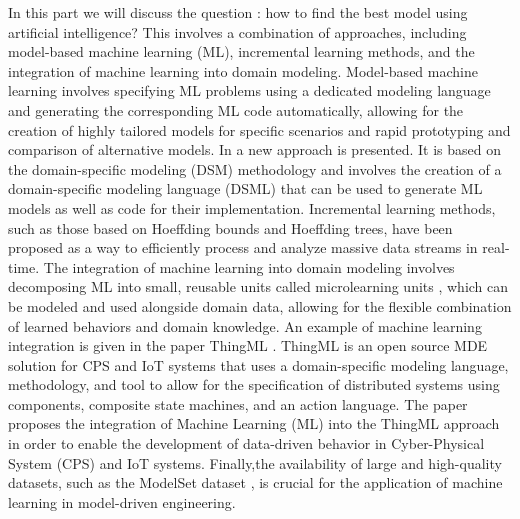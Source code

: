 In this part we will discuss the question : how to find the best model using artificial intelligence? This involves a combination of approaches, including model-based machine learning (ML), incremental learning methods, and the integration of machine learning into domain modeling. 
Model-based machine learning involves specifying ML problems using a dedicated modeling language and generating the corresponding ML code automatically, allowing for the creation of highly tailored models for specific scenarios and rapid prototyping and comparison of alternative models\cite{evolutionMDE}. In \cite{mdApproach} a new approach is presented. It is based on the domain-specific modeling (DSM) methodology and involves the creation of a domain-specific modeling language (DSML) that can be used to generate ML models as well as code for their implementation.
Incremental learning methods, such as those based on Hoeffding bounds and Hoeffding trees, have been proposed as a way to efficiently process and analyze massive data streams in real-time\cite{evolutionMDE}. 
The integration of machine learning into domain modeling involves decomposing ML into small, reusable units called microlearning units \cite{evolutionMDE}, which can be modeled and used alongside domain data, allowing for the flexible combination of learned behaviors and domain knowledge. An example of machine learning integration is given in the paper ThingML \cite{ThingML}.  ThingML is an open source MDE solution for CPS and IoT systems that uses a domain-specific modeling language, methodology, and tool to allow for the specification of distributed systems using components, composite state machines, and an action language. The paper proposes the integration of Machine Learning (ML) into the ThingML approach in order to enable the development of data-driven behavior in Cyber-Physical System (CPS) and IoT systems. Finally,the availability of large and high-quality datasets, such as the ModelSet dataset \cite{modelset}, is crucial for the application of machine learning in model-driven engineering.


